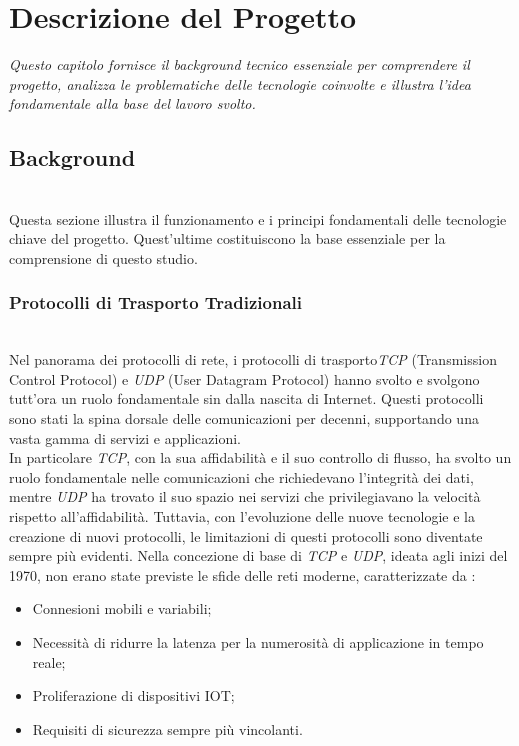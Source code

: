 \chapter{Descrizione del Progetto}
\label{cap:descrizione}

\textit{\indent Questo capitolo fornisce il background tecnico essenziale per comprendere il progetto, analizza le problematiche delle tecnologie coinvolte e illustra l'idea fondamentale alla base del lavoro svolto.}

\section{Background}

~\\
\indent Questa sezione illustra il funzionamento e i principi fondamentali delle tecnologie chiave del progetto.
Quest'ultime costituiscono la base essenziale per la comprensione di questo studio. 

\subsection{Protocolli di Trasporto Tradizionali}
~\\
\indent Nel panorama dei \gls{protocolli di rete}\glsfirstoccur, i \gls{protocolli di trasporto}\glsfirstoccur \emph{TCP} (Transmission Control Protocol) e \emph{UDP} (User Datagram Protocol) hanno svolto e svolgono tutt'ora un ruolo fondamentale sin dalla nascita di Internet.
Questi protocolli sono stati la spina dorsale delle comunicazioni per decenni, supportando una vasta gamma di servizi e applicazioni.\\
In particolare \emph{TCP}, con la sua affidabilità e il suo controllo di flusso, ha svolto un ruolo fondamentale nelle comunicazioni che richiedevano l'integrità dei dati, mentre \emph{UDP} ha trovato il suo spazio nei servizi che privilegiavano la velocità rispetto all'affidabilità. 
Tuttavia, con l'evoluzione delle nuove tecnologie e la creazione di nuovi protocolli, le limitazioni di questi protocolli sono diventate sempre più evidenti. Nella concezione di base di \emph{TCP} e \emph{UDP}, ideata agli inizi del 1970, non erano state previste le sfide delle reti moderne, 
caratterizzate da :  
\begin{itemize}
    \item Connesioni mobili e variabili;
    
    \item Necessità di ridurre la latenza per la numerosità di applicazione in tempo reale;
    
    \item Proliferazione di dispositivi IOT;
     
    \item Requisiti di sicurezza sempre più vincolanti.
\end{itemize}

